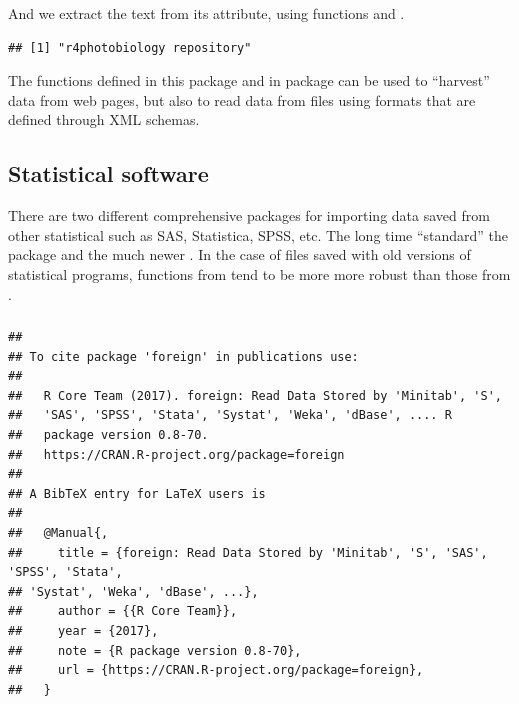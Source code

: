 \documentclass[krantz2]{krantz}\usepackage{knitr}%
\begin{document}
And we extract the text from its  attribute, using functions  and .

\begin{knitrout}\footnotesize
{}\color{fgcolor}\begin{kframe}
\begin{alltt}
\hlstd{(} \hlstd{))}
\end{alltt}
\begin{verbatim}
## [1] "r4photobiology repository"
\end{verbatim}
\end{kframe}
\end{knitrout}

The functions defined in this package and in package  can be used to ``harvest'' data from web pages, but also to read data from files using formats that are defined through XML schemas.

\subsection{Statistical software}\label{sec:files:stat}

There are two different comprehensive packages for importing data saved from other statistical such as SAS, Statistica, SPSS, etc. The long time ``standard'' the  package and the much newer . In the case of files saved with old versions of statistical programs, functions from  tend to be more more robust than those from .

\subsubsection[foreign]{}

\begin{knitrout}\footnotesize
{}\color{fgcolor}\begin{kframe}
\begin{alltt}
\hlstd{(} \hlstd{=} \hlstd{)}
\end{alltt}
\begin{verbatim}
## 
## To cite package 'foreign' in publications use:
## 
##   R Core Team (2017). foreign: Read Data Stored by 'Minitab', 'S',
##   'SAS', 'SPSS', 'Stata', 'Systat', 'Weka', 'dBase', .... R
##   package version 0.8-70.
##   https://CRAN.R-project.org/package=foreign
## 
## A BibTeX entry for LaTeX users is
## 
##   @Manual{,
##     title = {foreign: Read Data Stored by 'Minitab', 'S', 'SAS', 'SPSS', 'Stata',
## 'Systat', 'Weka', 'dBase', ...},
##     author = {{R Core Team}},
##     year = {2017},
##     note = {R package version 0.8-70},
##     url = {https://CRAN.R-project.org/package=foreign},
##   }
\end{verbatim}
\end{kframe}
\end{knitrout}
\end{document}
